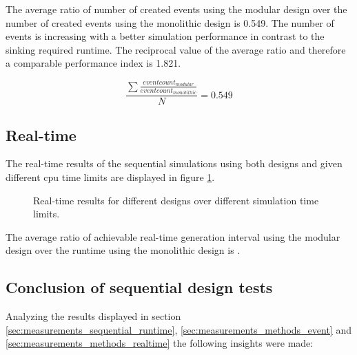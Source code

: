 The average ratio of number of created events using the modular design over the number of created events using the monolithic design is 0.549.
The number of events is increasing with a better simulation performance in contrast to the sinking required runtime.
The reciprocal value of the average ratio and therefore a comparable performance index is 1.821.

\[\frac{\sum\frac{eventcount_{modular}}{eventcount_{monolithic}}}{N} = 0.549\]

\subsection{Real-time}
\label{sec:measurements_sequential_realtime}

The real-time results of the sequential simulations using both designs and given different cpu time limits are displayed in figure \ref{fig:results_realtime_sim_time}.

\begin{figure}
    \centering
    \caption{Real-time results for different designs over different simulation time limits.}
    \label{fig:results_realtime_sim_time}
\end{figure}

The average ratio of achievable real-time generation interval using the modular design over the runtime using the monolithic design is . %

\subsection{Conclusion of sequential design tests}
\label{sec:measurements_sequential_conclusion}

Analyzing the results displayed in section \ref{sec:measurements_sequential_runtime}, \ref{sec:measurements_methods_event} and \ref{sec:measurements_methods_realtime} the following insights were made:

